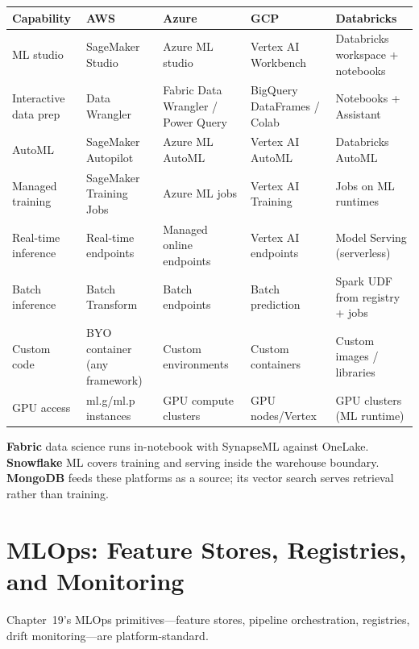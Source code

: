 \begin{center}
\footnotesize
\begin{tabular}{@{}p{2.4cm}p{2.9cm}p{2.9cm}p{2.9cm}p{2.9cm}@{}}
\toprule
\textbf{Capability} & \textbf{AWS} & \textbf{Azure} & \textbf{GCP} & \textbf{Databricks} \\
\midrule
ML studio & SageMaker Studio & Azure ML studio & Vertex AI Workbench & Databricks workspace + notebooks \\
Interactive data prep & Data Wrangler & Fabric Data Wrangler / Power Query & BigQuery DataFrames / Colab & Notebooks + Assistant \\
AutoML & SageMaker Autopilot & Azure ML AutoML & Vertex AI AutoML & Databricks AutoML \\
Managed training & SageMaker Training Jobs & Azure ML jobs & Vertex AI Training & Jobs on ML runtimes \\
Real-time inference & Real-time endpoints & Managed online endpoints & Vertex AI endpoints & Model Serving (serverless) \\
Batch inference & Batch Transform & Batch endpoints & Batch prediction & Spark UDF from registry + jobs \\
\addlinespace
Custom code & BYO container (any framework) & Custom environments & Custom containers & Custom images / libraries \\
GPU access & ml.g/ml.p instances & GPU compute clusters & GPU nodes/Vertex & GPU clusters (ML runtime) \\
\bottomrule
\end{tabular}
\end{center}

\noindent \textbf{Fabric} data science runs in-notebook with SynapseML against OneLake.
\textbf{Snowflake} ML covers training and serving inside the warehouse boundary.
\textbf{MongoDB} feeds these platforms as a source; its vector search serves retrieval rather
than training.

\section{MLOps: Feature Stores, Registries, and Monitoring}
%
Chapter~19's MLOps primitives---feature stores, pipeline orchestration, registries, drift
monitoring---are platform-standard.

